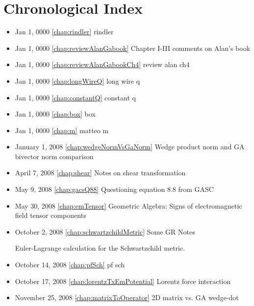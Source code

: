 \chapter{Chronological Index}
\label{chap:Chronology}

\begin{itemize}

\item Jan 1, 0000 \ref{chap:rindler} rindler

\item Jan 1, 0000 \ref{chap:reviewAlanGabook} Chapter I-III comments on Alan's book

\item Jan 1, 0000 \ref{chap:reviewAlanGabookCh4} review alan ch4

\item Jan 1, 0000 \ref{chap:longWireQ} long wire q

\item Jan 1, 0000 \ref{chap:constantQ} constant q

\item Jan 1, 0000 \ref{chap:box} box

\item Jan 1, 0000 \ref{chap:m} matteo m

\item January 1, 2008 \ref{chap:wedgeNormVsGaNorm} Wedge product norm and GA bivector norm comparison

\item April 7, 2008 \ref{chap:shear} Notes on shear transformation

\item May 9, 2008 \ref{chap:gacsQ88} Questioning equation 8.8 from GASC

\item May 30, 2008 \ref{chap:emTensor} Geometric Algebra: Signs of electromagnetic field tensor components

\item October 2, 2008 \ref{chap:schwartzchildMetric} Some GR Notes

Euler-Lagrange calculation for the Schwartzchild metric.\item October 14, 2008 \ref{chap:pfSch} pf sch

\item October 17, 2008 \ref{chap:lorentzTxEmPotential} Lorentz force interaction

\item November 25, 2008 \ref{chap:matrixToOperator} 2D matrix vs. GA wedge-dot


\end{itemize}
